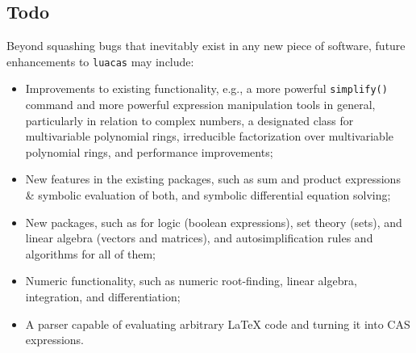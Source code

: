 \documentclass{article}
\begin{document}
\subsection{Todo}

Beyond squashing bugs that inevitably exist in any new piece of software, future enhancements to \texttt{luacas} may include:
\begin{itemize}
    \item Improvements to existing functionality, e.g., a more powerful \texttt{simplify()} command and more powerful expression manipulation tools in general, particularly in relation to complex numbers, a designated class for multivariable polynomial rings, irreducible factorization over multivariable polynomial rings, and performance improvements;
    \item New features in the existing packages, such as sum and product expressions \& symbolic evaluation of both, and symbolic differential equation solving;
    \item New packages, such as for logic (boolean expressions), set theory (sets), and linear algebra (vectors and matrices), and autosimplification rules and algorithms for all of them;
    \item Numeric functionality, such as numeric root-finding, linear algebra, integration, and differentiation;
    \item A parser capable of evaluating arbitrary LaTeX code and turning it into CAS expressions.
\end{itemize}
\end{document}

